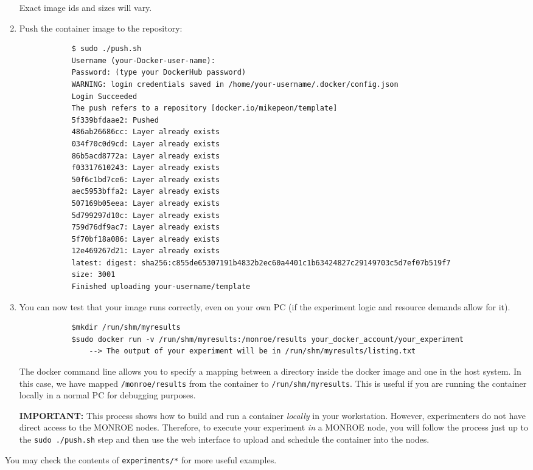\documentclass[a4paper,10pt]{article}
\newcommand{\VerbatimFont}{\footnotesize}
\newcommand{\monroe}{MONROE}
\newcommand{\identifier}[1]{{\texttt{\small{#1}}}}
\begin{document}
\begin{enumerate}
		Exact image ids and sizes will vary.
	\item Push the container image to the repository:
		{\VerbatimFont\begin{verbatim}
			$ sudo ./push.sh
			Username (your-Docker-user-name):
			Password: (type your DockerHub password)
			WARNING: login credentials saved in /home/your-username/.docker/config.json
			Login Succeeded
			The push refers to a repository [docker.io/mikepeon/template]
			5f339bfdaae2: Pushed
			486ab26686cc: Layer already exists
			034f70c0d9cd: Layer already exists
			86b5acd8772a: Layer already exists
			f03317610243: Layer already exists
			50f6c1bd7ce6: Layer already exists
			aec5953bffa2: Layer already exists
			507169b05eea: Layer already exists
			5d799297d10c: Layer already exists
			759d76df9ac7: Layer already exists
			5f70bf18a086: Layer already exists
			12e469267d21: Layer already exists
			latest: digest: sha256:c855de65307191b4832b2ec60a4401c1b63424827c29149703c5d7ef07b519f7
			size: 3001
			Finished uploading your-username/template
		\end{verbatim}}
	\item You can now test that your image runs correctly, even on your own PC (if the experiment logic and resource demands allow for it).
		{\VerbatimFont\begin{verbatim}
			$mkdir /run/shm/myresults
			$sudo docker run -v /run/shm/myresults:/monroe/results your_docker_account/your_experiment
			    --> The output of your experiment will be in /run/shm/myresults/listing.txt
		\end{verbatim}}
		The docker command line allows you to specify a mapping between a directory inside the docker image and one in the host system.
		In this case, we have mapped \identifier{/monroe/results} from the container to \identifier{/run/shm/my\-results}.
		This is useful if you are running the container locally in a normal PC for debugging purposes.
		
		\textbf{IMPORTANT:} This process shows how to build and run a container \emph{locally} in your workstation.
		However, experimenters do not have direct access to the \monroe{} nodes.
		Therefore, to execute your experiment \emph{in} a \monroe{} node, you will follow the process just up to the \identifier{sudo ./push.sh} step and then use the web interface to upload and schedule the container into the nodes.
\end{enumerate}

You may check the contents of \identifier{experiments/*} for more useful examples.
\end{document}
